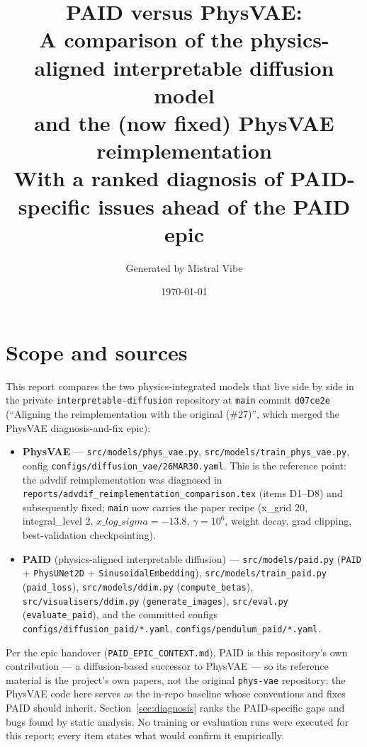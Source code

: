 \documentclass[11pt,a4paper]{article}
\title{PAID versus PhysVAE:\\
A comparison of the physics-aligned interpretable diffusion model\\ and the (now fixed) PhysVAE reimplementation\\
\large With a ranked diagnosis of PAID-specific issues ahead of the PAID epic}
\author{Generated by Mistral Vibe}
\date{\today}
\newcommand{\code}[1]{\texttt{#1}}
\begin{document}
\maketitle

\section*{Scope and sources}

This report compares the two physics-integrated models that live side by side in the
private \code{interpretable-diffusion} repository at \code{main} commit
\code{d07ce2e} (``Aligning the reimplementation with the original (\#27)'', which
merged the PhysVAE diagnosis-and-fix epic):

\begin{itemize}[nosep]
  \item \textbf{PhysVAE} --- \code{src/models/phys\_vae.py},
        \code{src/models/train\_phys\_vae.py}, config
        \code{configs/diffusion\_vae/26MAR30.yaml}. This is the reference point:
        the advdif reimplementation was diagnosed in
        \code{reports/advdif\_reimplementation\_comparison.tex} (items D1--D8) and
        subsequently fixed; \code{main} now carries the paper recipe (x\_grid 20,
        integral\_level 2, $\mathit{x\_log\_sigma} = -13.8$, $\gamma = 10^6$,
        weight decay, grad clipping, best-validation checkpointing).
  \item \textbf{PAID} (physics-aligned interpretable diffusion) ---
        \code{src/models/paid.py} (\code{PAID} + \code{PhysUNet2D} +
        \code{SinusoidalEmbedding}), \code{src/models/train\_paid.py}
        (\code{paid\_loss}), \code{src/models/ddim.py} (\code{compute\_betas}),
        \code{src/visualisers/ddim.py} (\code{generate\_images}),
        \code{src/eval.py} (\code{evaluate\_paid}), and the committed configs
        \code{configs/diffusion\_paid/*.yaml}, \code{configs/pendulum\_paid/*.yaml}.
\end{itemize}

Per the epic handover (\code{PAID\_EPIC\_CONTEXT.md}), PAID is this repository's own
contribution --- a diffusion-based successor to PhysVAE --- so its reference material
is the project's own papers, not the original \code{phys-vae} repository; the
PhysVAE code here serves as the in-repo baseline whose conventions and fixes PAID
should inherit. Section~\ref{sec:diagnosis} ranks the PAID-specific gaps and bugs
found by static analysis. No training or evaluation runs were executed for this
report; every item states what would confirm it empirically.
\end{document}
